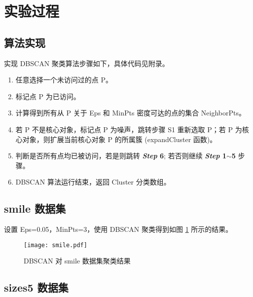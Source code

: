 \documentclass[12pt,AutoFakeBold]{article}
\begin{document}
\section{实验过程}

\subsection{算法实现}

实现 DBSCAN 聚类算法步骤如下，具体代码见附录。

\begin{enumerate}
\renewcommand{\labelenumi}{\bfseries \textit{Step} \theenumi.}

\item 任意选择一个未访问过的点 P。

\item 标记点 P 为已访问。

\item 计算得到所有从 P 关于 Eps 和 MinPts 密度可达的点的集合 NeighborPts。

\item 若 P 不是核心对象，标记点 P 为噪声，跳转步骤 S1 重新选取 P；若 P 为核心对象，则扩展当前核心对象 P 的所属簇 (expandCluster 函数)。

\item 判断是否所有点均已被访问，若是则跳转 \textbf{\textit{Step} 6}; 若否则继续 \textbf{\textit{Step} 1$\sim$5} 步骤。

\item DBSCAN 算法运行结束，返回 Cluster 分类数组。
\end{enumerate}

\subsection{smile 数据集}

设置 Eps=0.05，MinPts=3，使用 DBSCAN 聚类得到如图 \ref{fig:smile} 所示的结果。

\begin{figure}[H]
	\centering
    \texttt{[image: smile.pdf]}
    \caption{DBSCAN 对 smile 数据集聚类结果} \label{fig:smile}
\end{figure}

\subsection{sizes5 数据集}
\end{document}
